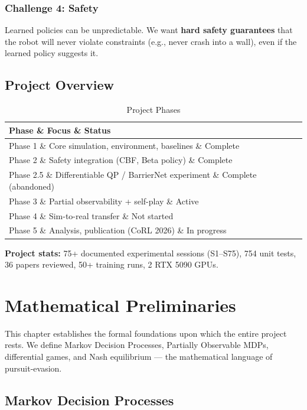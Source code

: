 \documentclass[11pt,a4paper]{report}
\begin{document}
\subsection{Challenge 4: Safety}
Learned policies can be unpredictable. We want \textbf{hard safety guarantees} that the robot will never violate constraints (e.g., never crash into a wall), even if the learned policy suggests it.

\section{Project Overview}

\begin{table}[h]
\centering
\caption{Project Phases}
\label{tab:phases}
\begin{tabular}{@{}lll@{}}
\toprule
\textbf{Phase} \& \textbf{Focus} \& \textbf{Status} \\
\midrule
Phase 1 \& Core simulation, environment, baselines \& Complete \\
Phase 2 \& Safety integration (CBF, Beta policy) \& Complete \\
Phase 2.5 \& Differentiable QP / BarrierNet experiment \& Complete (abandoned) \\
Phase 3 \& Partial observability + self-play \& Active \\
Phase 4 \& Sim-to-real transfer \& Not started \\
Phase 5 \& Analysis, publication (CoRL 2026) \& In progress \\
\bottomrule
\end{tabular}
\end{table}

\textbf{Project stats:} 75+ documented experimental sessions (S1--S75), 754 unit tests, 36 papers reviewed, 50+ training runs, 2 RTX 5090 GPUs.

\chapter{Mathematical Preliminaries}
\label{chap:math}

This chapter establishes the formal foundations upon which the entire project rests. We define Markov Decision Processes, Partially Observable MDPs, differential games, and Nash equilibrium --- the mathematical language of pursuit-evasion.

\section{Markov Decision Processes}
\end{document}
